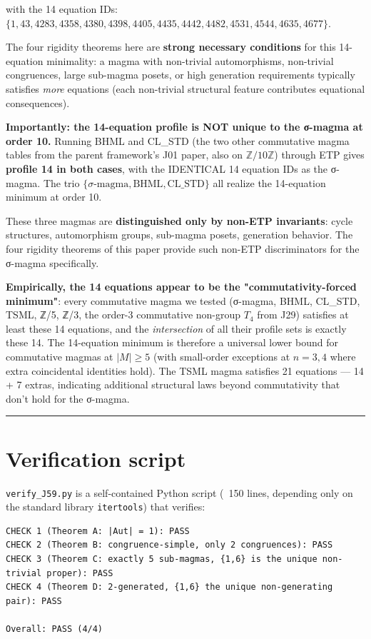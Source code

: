 \documentclass[11pt,reqno]{amsart}
\theoremstyle{plain}
\theoremstyle{definition}
\begin{document}
with the 14 equation IDs: $\{1, 43, 4283, 4358, 4380, 4398, 4405, 4435, 4442, 4482, 4531, 4544, 4635, 4677\}$.

The four rigidity theorems here are \textbf{strong necessary conditions} for this 14-equation minimality: a magma with non-trivial automorphisms, non-trivial congruences, large sub-magma posets, or high generation requirements typically satisfies \textit{more} equations (each non-trivial structural feature contributes equational consequences).

\textbf{Importantly: the 14-equation profile is NOT unique to the σ-magma at order 10.} Running BHML and CL_STD (the two other commutative magma tables from the parent framework's J01 paper, also on $\mathbb{Z}/10\mathbb{Z}$) through ETP gives \textbf{profile 14 in both cases}, with the IDENTICAL 14 equation IDs as the σ-magma. The trio $\{σ\text{-magma}, \text{BHML}, \text{CL\_STD}\}$ all realize the 14-equation minimum at order 10.

These three magmas are \textbf{distinguished only by non-ETP invariants}: cycle structures, automorphism groups, sub-magma posets, generation behavior. The four rigidity theorems of this paper provide such non-ETP discriminators for the σ-magma specifically.

\textbf{Empirically, the 14 equations appear to be the "commutativity-forced minimum"}: every commutative magma we tested (σ-magma, BHML, CL_STD, TSML, ℤ/5, ℤ/3, the order-3 commutative non-group $T_4$ from J29) satisfies at least these 14 equations, and the \textit{intersection} of all their profile sets is exactly these 14. The 14-equation minimum is therefore a universal lower bound for commutative magmas at $|M| \geq 5$ (with small-order exceptions at $n = 3, 4$ where extra coincidental identities hold). The TSML magma satisfies 21 equations --- 14 + 7 extras, indicating additional structural laws beyond commutativity that don't hold for the σ-magma.

\medskip\hrule\medskip

\section{Verification script}

\texttt{verify_J59.py} is a self-contained Python script (~150 lines, depending only on the standard library \texttt{itertools}) that verifies:

\begin{verbatim}
CHECK 1 (Theorem A: |Aut| = 1): PASS
CHECK 2 (Theorem B: congruence-simple, only 2 congruences): PASS
CHECK 3 (Theorem C: exactly 5 sub-magmas, {1,6} is the unique non-trivial proper): PASS
CHECK 4 (Theorem D: 2-generated, {1,6} the unique non-generating pair): PASS

Overall: PASS (4/4)
\end{verbatim}
\end{document}
